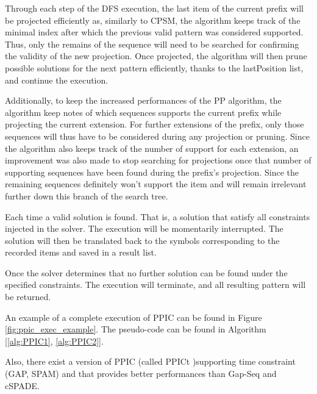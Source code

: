 \documentclass{eplmastersthesis}
\begin{document}
\begin{enumerate}
Through each step of the DFS execution, the last item of the current prefix will be projected efficiently as, similarly to CPSM, the algorithm keeps track of the minimal index after which the previous valid pattern was considered supported. Thus, only the remains of the sequence will need to be searched for confirming the validity of the new projection. Once projected, the algorithm will then prune possible solutions for the next pattern efficiently, thanks to the lastPosition list, and continue the execution. 

Additionally, to keep the increased performances of the PP algorithm, the algorithm keep notes of which sequences supports the current prefix while projecting the current extension. For further extensions of the prefix, only those sequences will thus have to be considered during any projection or pruning. Since the algorithm also keeps track of the number of support for each extension, an improvement was also made to stop searching for projections once that number of supporting sequences have been found during the prefix's projection. Since the remaining sequences definitely won't support the item and will remain irrelevant further down this branch of the search tree. \newline

Each time a valid solution is found. That is, a solution that satisfy all constraints injected in the solver. The execution will be momentarily interrupted. The solution will then be translated back to the symbols corresponding to the recorded items and saved in a result list. \newline

Once the solver determines that no further solution can be found under the specified constraints. The execution will terminate, and all resulting pattern will be returned.
\end{enumerate}

An example of a complete execution of PPIC can be found in Figure \ref{fig:ppic_exec_example}. The pseudo-code can be found in Algorithm [\ref{alg:PPIC1}, \ref{alg:PPIC2}]. \newline

Also, there exist a version of PPIC (called PPICt \cite{aogamining})supporting time constraint (GAP, SPAM) and that provides better performances than Gap-Seq and cSPADE.
\end{document}

